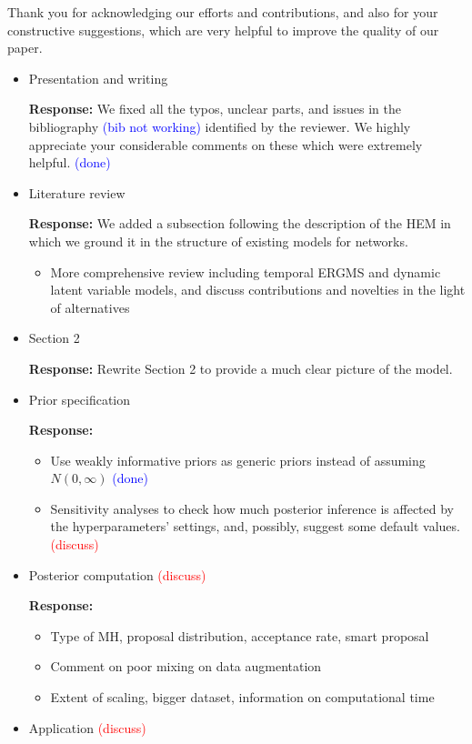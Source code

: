 \documentclass[12pt]{article}
\theoremstyle{definition}
\begin{document}
Thank you for acknowledging our efforts and contributions, and also for your constructive suggestions, which are very helpful to improve the quality of our paper.
\begin{itemize}
	\item Presentation and writing
	
	\textbf{  Response:} We fixed all the typos, unclear parts, and issues in the bibliography \textcolor{blue}{(bib not working)} identified by the reviewer. We highly appreciate your considerable comments on these which were extremely helpful. \textcolor{blue}{(done)}

  \item Literature review

\textbf{  Response:}  We added a subsection following the description of the HEM in which we ground it in the structure of existing models for networks. 
\begin{itemize}
	\item More comprehensive review including temporal ERGMS and dynamic latent variable models, and discuss contributions and novelties in the light of alternatives
\end{itemize}

\item Section 2

\textbf{  Response:} Rewrite Section 2 to provide a much clear picture of the model.


\item Prior specification

\textbf{  Response:} 
\begin{itemize}
	\item Use weakly informative priors as generic priors instead of assuming $N(0, \infty)$  \textcolor{blue}{(done)}
	\item Sensitivity analyses to check how much posterior inference is affected by the hyperparameters' settings, and, possibly, suggest some default values.  \textcolor{red}{(discuss)} 
\end{itemize}

\item Posterior computation  \textcolor{red}{(discuss)} 

\textbf{  Response:} 
\begin{itemize}
	\item Type of MH, proposal distribution, acceptance rate, smart proposal
	\item Comment on poor mixing on data augmentation
	\item Extent of scaling, bigger dataset, information on computational time
\end{itemize}
\item Application  \textcolor{red}{(discuss)} 


\end{itemize}
\end{document}
